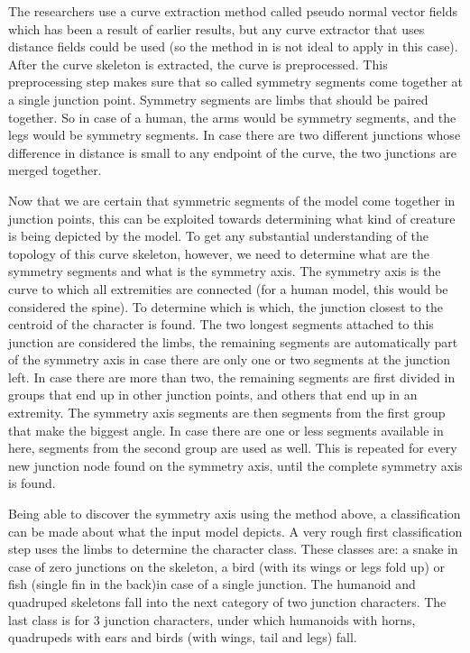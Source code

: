 \documentclass{article}
\begin{document}
The researchers use a curve extraction method called pseudo normal vector fields
which has been a result of earlier results, but any curve extractor that uses
distance fields could be used (so the method in \citep{paper2} is not ideal to
apply in this case). After the curve skeleton is extracted, the
curve is preprocessed. This preprocessing step makes sure that so called
symmetry segments come together at a single junction point. Symmetry segments
are limbs that should be paired together. So in case of a human, the arms would
be symmetry segments, and the legs would be symmetry segments. In case there are
two different junctions whose difference in distance is small to any endpoint of
the curve, the two junctions are merged together.

Now that we are certain that symmetric segments of the model come
together in junction points, this can be exploited towards determining what kind
of creature is being depicted by the model. To get any substantial understanding
of the topology of this curve skeleton, however, we need to determine what are
the symmetry segments and what is the symmetry axis. The symmetry axis is the
curve to which all extremities are connected (for a human model, this would be
considered the spine). To determine which is which, the
junction closest to the centroid of the character is found. The two longest
segments attached to this junction are considered the limbs, the remaining
segments are automatically part of the symmetry axis in case there are only one
or two segments at the junction left. In case there are more than two, the
remaining segments are first divided in groups that end up in other junction
points, and others that end up in an extremity. The symmetry axis segments are
then segments from the first group that make the biggest angle. In case there
are one or less segments available in here, segments from the second group are
used as well. This is repeated for every new junction node found on the symmetry
axis, until the complete symmetry axis is found.

Being able to discover the symmetry axis using the method above, a
classification can be made about what the input model depicts. A very rough
first classification step uses the limbs to determine the character class. These
classes are:  a snake in case of zero junctions on the skeleton,
a bird (with its wings or legs fold up) or fish (single fin in the back)in case
of a single junction. The humanoid and quadruped skeletons fall into the next
category of two junction characters. The last class is for 3 junction
characters, under which humanoids with horns, quadrupeds with ears and birds
(with wings, tail and legs) fall.
\end{document}
